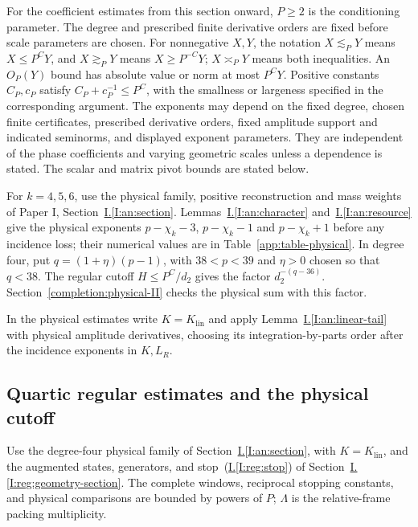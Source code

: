 \documentclass[11pt]{amsart}
\theoremstyle{definition}
\theoremstyle{remark}
\numberwithin{equation}{section}
\newcommand{\partIref}[1]{\hyperref[I:#1]{I.\ref*{I:#1}}}
\newcommand{\partIeqref}[1]{\textup{(\partIref{#1})}}
\begin{document}
For the coefficient estimates from this section onward, $P\ge2$ is the conditioning parameter. The degree and prescribed finite derivative orders are fixed before scale parameters are chosen. For nonnegative $X,Y$, the notation $X\lesssim_P Y$ means $X\le P^CY$, and $X\gtrsim_PY$ means $X\ge P^{-C}Y$; $X\asymp_PY$ means both inequalities. An $O_P(Y)$ bound has absolute value or norm at most $P^CY$. Positive constants $C_P,c_P$ satisfy $C_P+c_P^{-1}\le P^C$, with the smallness or largeness specified in the corresponding argument. The exponents may depend on the fixed degree, chosen finite certificates, prescribed derivative orders, fixed amplitude support and indicated seminorms, and displayed exponent parameters. They are independent of the phase coefficients and varying geometric scales unless a dependence is stated. The scalar and matrix pivot bounds are stated below.

For $k=4,5,6$, use the physical family, positive reconstruction and mass weights of Paper I, Section~\partIref{an:section}. Lemmas~\partIref{an:character} and~\partIref{an:resource} give the physical exponents $p-\chi_k-3$, $p-\chi_k-1$ and $p-\chi_k+1$ before any incidence loss; their numerical values are in Table~\ref{app:table-physical}. In degree four, put $q=(1+\eta)(p-1)$, with $38<p<39$ and $\eta>0$ chosen so that $q<38$. The regular cutoff $H\le P^C/d_2$ gives the factor $d_2^{-(q-36)}$. Section~\ref{completion:physical-II} checks the physical sum with this factor.

In the physical estimates write $K=K_{\mathrm{lin}}$ and apply Lemma~\partIref{an:linear-tail} with physical amplitude derivatives, choosing its integration-by-parts order after the incidence exponents in $K,L_R$.

\subsection{Quartic regular estimates and the physical cutoff}\label{reg:quartic}\label{reg:finite4}\label{low:4:cf:framework}\label{low:4:rc:section}\label{low:4:cf:allocation}\label{low:4:cf:spine_geometry}\label{low:4:cf:counting}\label{low:4:rd:section}\label{low:4:rr:f}\label{low:4:rr:a}\label{low:4:rr:central}

Use the degree-four physical family of Section~\partIref{an:section}, with $K=K_{\mathrm{lin}}$, and the augmented states, generators, and stop~\partIeqref{reg:stop} of Section~\partIref{reg:geometry-section}. The complete windows, reciprocal stopping constants, and physical comparisons are bounded by powers of $P$; $\Lambda$ is the relative-frame packing multiplicity.
\end{document}
